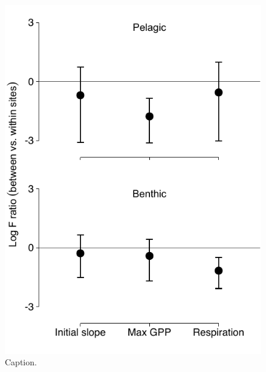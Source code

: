 \documentclass[12pt]{article}
\renewcommand{\thetable}{\Roman{table}}
\begin{document}
\begin{figure}
\centering
\linespread{1}
\includegraphics{../analysis/figures/fig_var.pdf}
\caption{\label{fig:var}
Caption. 
}
\end{figure}

\clearpage




\renewcommand{\thefigure}{S\arabic{figure}}
\renewcommand{\theequation}{S\arabic{equation}}
\renewcommand{\thetable}{S\arabic{table}}
\setcounter{equation}{0}
\setcounter{figure}{0}
\setcounter{table}{0}
\end{document}

